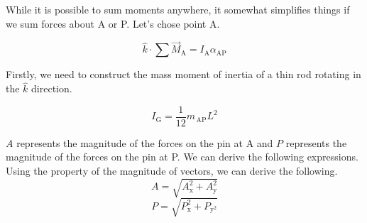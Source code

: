 \documentclass[nofoot,pdf-a,balance,colorlinks,upint,subscriptcorrection,varvw,mathalfa=cal=boondoxo]{asmeconf}
\begin{document}
    

    While it is possible to sum moments anywhere, it somewhat simplifies things if we sum forces about A or P. Let's chose point A.

    \begin{equation}
        \hat{k}\cdot\sum{\vec{M}_{\textrm{A}}} = I_{\textrm{A}}\alpha_{\textrm{AP}}
    \end{equation}

    Firstly, we need to construct the mass moment of inertia of a thin rod rotating in the $\hat{k}$ direction.


    \begin{equation} 
        I_{\textrm{G}} = \frac{1}{12}m_{\,\textrm{AP}}L^2
    \end{equation}



    $A$ represents the magnitude of the forces on the pin at A and $P$ represents the magnitude of the forces on the pin at P. We can derive the following expressions. Using the property of the magnitude of vectors, we can derive the following.
    \begin{equation}
        A = \sqrt{A_{\textrm{x}}^2 + A_{\textrm{y}}^2}
    \end{equation}
    \begin{equation}
        P = \sqrt{P_{\textrm{x}}^2 + P_{\textrm{y}^2}}
    \end{equation}
\end{document}

